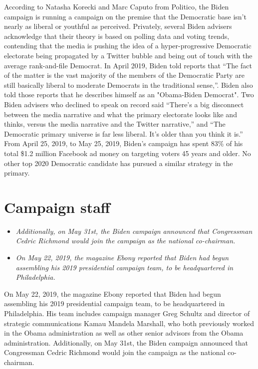 According to Natasha Korecki and Marc Caputo from Politico, the Biden
campaign is running a campaign on the premise that the Democratic base
isn't nearly as liberal or youthful as perceived. Privately, several
Biden advisers acknowledge that their theory is based on polling data
and voting trends, contending that the media is pushing the idea of a
hyper-progressive Democratic electorate being propagated by a Twitter
bubble and being out of touch with the average rank-and-file Democrat.
In April 2019, Biden told reports that ``The fact of the matter is the
vast majority of the members of the Democratic Party are still basically
liberal to moderate Democrats in the traditional sense,''. Biden also
told those reports that he describes himself as an "Obama-Biden
Democrat". Two Biden advisers who declined to speak on record said
``There's a big disconnect between the media narrative and what the
primary electorate looks like and thinks, versus the media narrative and
the Twitter narrative,'' and ``The Democratic primary universe is far
less liberal. It's older than you think it is.'' From April 25, 2019, to
May 25, 2019, Biden's campaign has spent 83\% of his total \$1.2 million
Facebook ad money on targeting voters 45 years and older. No other top
2020 Democratic candidate has pursued a similar strategy in the primary.

\section{Campaign staff}\label{campaign-staff}

\begin{itemize}
\item
  \emph{Additionally, on May 31st, the Biden campaign announced that
  Congressman Cedric Richmond would join the campaign as the national
  co-chairman.}
\item
  \emph{On May 22, 2019, the magazine Ebony reported that Biden had
  begun assembling his 2019 presidential campaign team, to be
  headquartered in Philadelphia.}
\end{itemize}

On May 22, 2019, the magazine Ebony reported that Biden had begun
assembling his 2019 presidential campaign team, to be headquartered in
Philadelphia. His team includes campaign manager Greg Schultz and
director of strategic communications Kamau Mandela Marshall, who both
previously worked in the Obama administration as well as other senior
advisors from the Obama administration. Additionally, on May 31st, the
Biden campaign announced that Congressman Cedric Richmond would join the
campaign as the national co-chairman.

